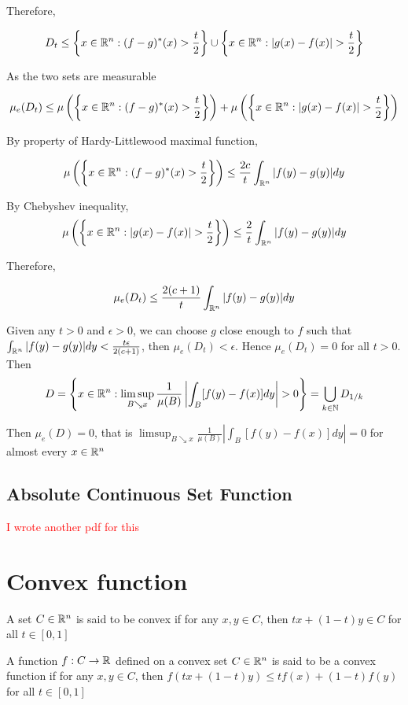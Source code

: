 \documentclass{report}
\begin{document}
Therefore,

\[
    D_t \leq \left\{ x \in \mathbb{R}^n: (f - g)^*(x) > \frac{t}{2} \right\} \cup \left\{ x \in \mathbb{R}^n: |g(x) - f(x)| > \frac{t}{2} \right\}
\]

As the two sets are measurable

\[
    \mu_e(D_t) \leq \mu\left(\left\{ x \in \mathbb{R}^n: (f - g)^*(x) > \frac{t}{2} \right\} \right) + \mu\left(\left\{ x \in \mathbb{R}^n: |g(x) - f(x)| > \frac{t}{2} \right\}\right)
\]

By property of Hardy-Littlewood maximal function, 

\[
    \mu\left(\left\{ x \in \mathbb{R}^n: (f - g)^*(x) > \frac{t}{2} \right\} \right) \leq \frac{2c}{t} \int_{\mathbb{R}^n} |f(y) - g(y)| dy
\]

By Chebyshev inequality,
\[
    \mu\left(\left\{ x \in \mathbb{R}^n: |g(x) - f(x)| > \frac{t}{2} \right\}\right) \leq \frac{2}{t} \int_{\mathbb{R}^n} |f(y) - g(y)| dy
\]

Therefore,

\[
    \mu_e(D_t) \leq \frac{2(c+1)}{t} \int_{\mathbb{R}^n} |f(y) - g(y)| dy
\]

Given any $t > 0$ and $\epsilon > 0$, we can choose $g$ close enough to $f$ such that $\int_{\mathbb{R}^n} |f(y) - g(y)| dy < \frac{t \epsilon}{2(c+1)}$, then $\mu_e(D_t) < \epsilon$. Hence $\mu_e(D_t) = 0$ for all $t > 0$. Then 
\[
    D = \left\{ x \in \mathbb{R}^n: \limsup_{B \searrow x}  \frac{1}{\mu(B)} \left| \int_B [f(y) - f(x)]dy \right| > 0 \right\} = \bigcup_{k \in \mathbb{N}} D_{1/k}
\]

Then $\mu_e(D) = 0$, that is $\limsup_{B \searrow x}  \frac{1}{\mu(B)} \left| \int_B [f(y) - f(x)]dy \right| = 0$ for almost every $x \in \mathbb{R}^n$

\section{Absolute Continuous Set Function}

\textcolor{red}{I wrote another pdf for this}

\chapter{Convex function}

\begin{definition}
    A set $C \in \mathbb{R}^n$ is said to be convex if for any $x, y \in C$, then $t x + (1-t) y \in C$ for all $t \in [0, 1]$
\end{definition}

\begin{definition}
    A function $f: C \to \mathbb{R}$ defined on a convex set $C \in \mathbb{R}^n$ is said to be a convex function if for any $x, y \in C$, then $f(t x + (1-t) y) \leq t f(x) + (1-t) f(y)$ for all $t \in [0, 1]$
\end{definition}
\end{document}
